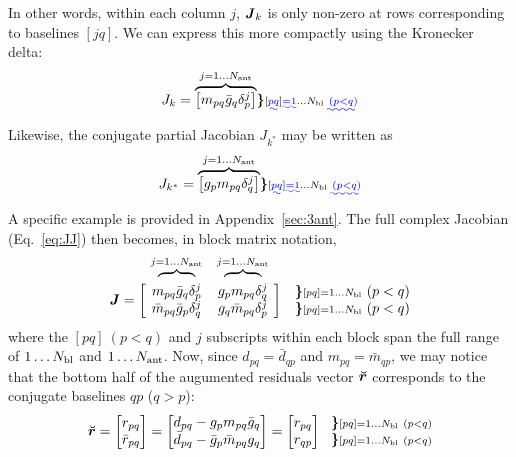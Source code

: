 \documentclass[useAMS,usenatbib]{mn2e}
\makeatletter
\newcommand{\mat}[1]{{\bmath{#1}}}
\newcommand{\JJ}{\mat{J}} %
\newcommand{\Matrix}[2]{\left [ \begin{array}{@{}#1@{}}#2\end{array} \right ]}
\newcommand{\Stack}[1]{\begin{array}{@{}c@{}}#1\end{array}}
\newcommand{\AUG}[1]{\bmath{\breve{#1}}}
\newcommand{\Rr}{\AUG{r}}
\numberwithin{equation}{section}
\providecommand{\DIFadd}[1]{{\protect\color{blue}\uwave{#1}}} %
\providecommand{\DIFaddbegin}{} %
\providecommand{\DIFaddend}{} %
\providecommand{\DIFdelbegin}{} %
\providecommand{\DIFdelend}{} %
\makeatother
\begin{document}
In other words, within each column $j$, $\JJ_k$ is only non-zero at rows corresponding to baselines $[jq]$. We can express 
this more compactly using the Kronecker delta:
\begin{equation}
\label{eq:Jk}
J_k = \overbrace{ \Matrix{c}{ m_{pq}\bar{g}_q\delta^{j}_p } } ^{j=1\dots \Na} \DIFdelbegin %
\DIFdelend \DIFaddbegin \bm{ \}} {\scriptstyle [\DIFadd{pq}]\DIFadd{=1}\dots \Nbl\DIFadd{~(p<q)}}
\DIFaddend \end{equation}
Likewise, the conjugate partial Jacobian $J_{k^*}$ may be written as
\begin{equation}
\label{eq:Jbark}
J_{k^*} = \overbrace{ \Matrix{c}{ g_p m_{pq} \delta^{j}_q } } ^{j=1\dots \Na} \DIFdelbegin %
\DIFdelend \DIFaddbegin \bm{ \}} {\scriptstyle [\DIFadd{pq}]\DIFadd{=1}\dots \Nbl\DIFadd{~(p<q)}}
\DIFaddend \end{equation}
A specific example is provided in Appendix~\ref{sec:3ant}. The full complex Jacobian (Eq.~\ref{eq:JJ}) then 
becomes, in block matrix notation,
\begin{equation}
\label{eq:JJ:di:basic}
\begin{array}{r@{~}cc@{~}cc}
                & \overbrace{~~~~~~~~}^{j=1\dots \Na} & \overbrace{~~~~~~~~}^{j=1\dots \Na} \\
\JJ = \bigg [ &
  \Stack{ m_{pq}\bar{g}_q\delta^{j}_p \\ \bar{m}_{pq} \bar{g}_p \delta^{j}_q } &
  \Stack{ g_p m_{pq} \delta^{j}_q \\ g_q \bar{m}_{pq} \delta^{j}_p }  
& \bigg ] &
\DIFdelbegin %
\DIFdelend \DIFaddbegin \Stack{ \bm{\}} \DIFaddend {\scriptstyle [pq]=1\dots \Nbl}~(p<q) \\ \DIFdelbegin %
\DIFdelend \DIFaddbegin \bm{\}} \DIFaddend {\scriptstyle [pq]=1\dots \Nbl}~(p<q) }
\end{array}
\end{equation}
where the $[pq]~(p<q)$ and $j$ subscripts within each block span the full range of $1\dots N_\mathrm{bl}$ and 
$1\dots N_\mathrm{ant}$. Now, since $d_{pq} = \bar{d}_{qp}$ and $m_{pq} = \bar{m}_{qp}$, we may notice
that the bottom half of the augumented residuals vector $\Rr$ corresponds to the conjugate baselines 
$qp$ ($q>p$):
\begin{equation}
\Rr = \Matrix{c}{ r_{pq} \\ \bar{r}_{pq} } = \Matrix{c}{d_{pq}-g_p m_{pq}\bar{g}_q\\ \bar{d}_{pq}-\bar{g}_p \bar{m}_{pq}g_q} = 
\Matrix{c}{ r_{pq} \\ r_{qp} }~~ 
\DIFdelbegin %
\DIFdelend \DIFaddbegin \Stack{ \bm{\}} \DIFaddend \scriptstyle [pq]=1\dots \Nbl~(p<q) \\ \DIFdelbegin %
\DIFdelend \DIFaddbegin \bm{\}} \DIFaddend \scriptstyle [pq]=1\dots \Nbl~(p<q) }
\end{equation}
\end{document}
